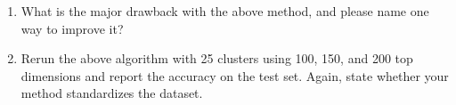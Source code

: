 \begin{enumerate}
\item {} What is the major drawback with the above method, and please name one way to improve it?


\item {} Rerun the above algorithm with 25 clusters using 100, 150, and 200 top dimensions and report the accuracy on the test set. Again, state whether your method standardizes the dataset.

  
\end{enumerate}
